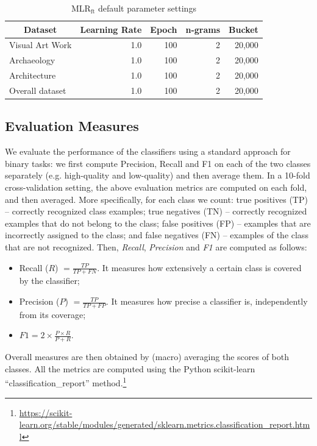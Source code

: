 \documentclass[epsfig,a4paper,12pt,titlepage]{book}
\newcommand{\mlr}{MLR$_\text{ft}$\xspace}
\begin{document}
\begin{table}[t]

\caption{\mlr default parameter settings}
		\label{tab:mlr_param}       %
\centering
\begin{tabular}{|l|r|r|r|r|} 
\hline
\multicolumn{1}{|c|}{Dataset} & \multicolumn{1}{|c|}{Learning Rate} & \multicolumn{1}{|c|}{Epoch} & \multicolumn{1}{|c|}{n-grams}& \multicolumn{1}{|c|}{Bucket}  \\ 
\hline
Visual Art Work             & 1.0    & 100    & 2 & 20,000        \\ \hline
Archaeology                 & 1.0    & 100    & 2 & 20,000         \\ \hline
Architecture                & 1.0    & 100    & 2 & 20,000        \\ \hline
\hline
Overall dataset             & 1.0    & 100    & 2 & 20,000     \\\hline
\hline
\end{tabular}

\end{table}
\subsection{Evaluation Measures}
\label{susec:evaluation_measure}

We evaluate the performance of the classifiers using a standard approach for binary tasks: we first compute Precision, Recall and F1 on each of the two classes separately (e.g. high-quality and low-quality) and then average them. In a 10-fold cross-validation setting, the above evaluation metrics are computed on each fold, and then averaged. 
More specifically, for each class we count: true positives (TP) -- correctly recognized class examples; true negatives (TN) -- correctly recognized examples that do not belong to the class; false positives (FP) -- examples that are incorrectly assigned to the class; and false negatives (FN) -- examples of the class that are not recognized.
Then, \textit{Recall}, \textit{Precision} and \textit{F1} are computed as follows:
\begin{itemize}
    \item Recall ($R$) $= \frac{TP}{TP  + FN }$. It measures how extensively a certain class is covered by the classifier;
    \item Precision ($P$) $= \frac{TP}{TP  + FP }$. It measures how precise a classifier is, independently from its coverage;
    \item $F1 = 2 \times \frac{P \times R}{P+R}$.
\end{itemize}
Overall measures are then obtained by (macro) averaging the scores of both classes. All the metrics are computed using the Python scikit-learn ``classification\_report'' method.\footnote{\url{https://scikit-learn.org/stable/modules/generated/sklearn.metrics.classification_report.html}}
\end{document}
